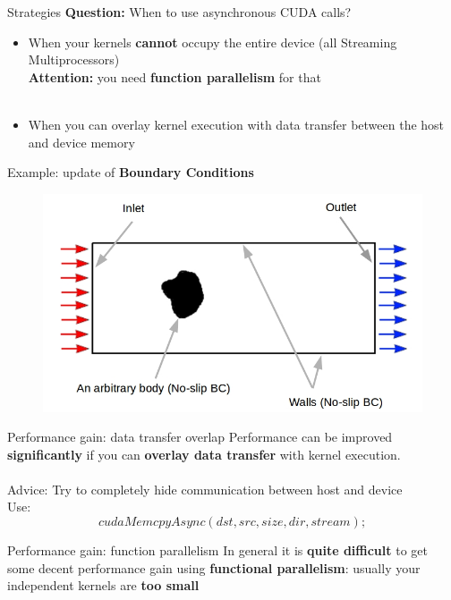 \documentclass[9pt]{beamer}
\newcommand{\emphasize}[1]{\textbf{\color{red} #1 } }
\begin{document}
\begin{frame}[t]{Strategies}
\textbf{Question:} When to use asynchronous CUDA calls?

\begin{itemize}
\item When your kernels \textbf{cannot} occupy the entire device (all Streaming Multiprocessors)\\
\emphasize{Attention:} you need \textbf{function parallelism} for that
\\~\\
\item When you can overlay kernel execution with data transfer between the host and device memory
\end{itemize}

\medskip
Example: update of \textbf{Boundary Conditions}
\begin{figure}
\includegraphics[scale=0.27]{images/wind-tunnel.jpg}
\centering
\end{figure}
\end{frame}

\begin{frame}[t]{Performance gain: data transfer overlap}
Performance can be improved \textbf{significantly} if you can \textbf{overlay data transfer} with kernel execution.
\\~\\
Advice: Try to completely hide communication between host and device\\
\medskip
Use: 
\[cudaMemcpyAsync( dst, src, size, dir, stream); \]
\end{frame}

\begin{frame}[t]{Performance gain: function parallelism}
In general it is \textbf{quite difficult} to get some decent performance gain using \textbf{functional parallelism}: usually your independent kernels are \textbf{too small}
\end{frame}
\end{document}
